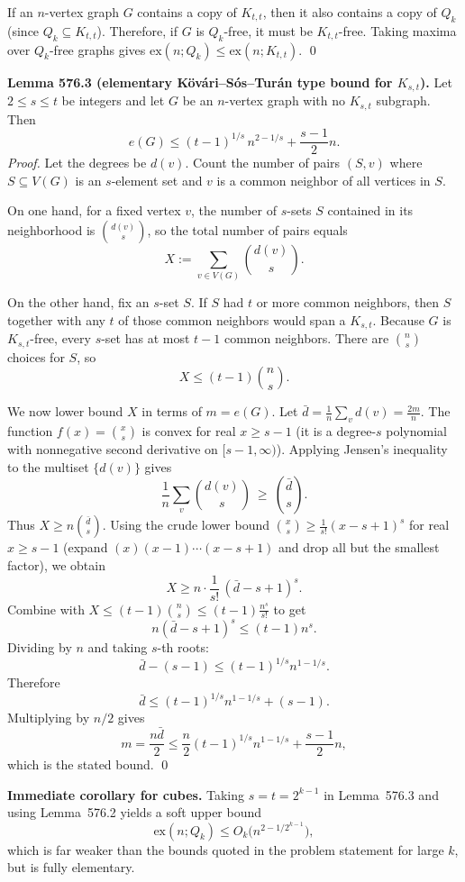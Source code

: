 If an $n$-vertex graph $G$ contains a copy of $K_{t,t}$, then it also contains a copy of $Q_k$ (since $Q_k\subseteq K_{t,t}$).
Therefore, if $G$ is $Q_k$-free, it must be $K_{t,t}$-free.
Taking maxima over $Q_k$-free graphs gives
$\mathrm{ex}(n;Q_k)\le \mathrm{ex}(n;K_{t,t})$.
\qed

\medskip
\textbf{Lemma 576.3 (elementary K\"ov\'ari--S\'os--Tur\'an type bound for $K_{s,t}$).}
Let $2\le s\le t$ be integers and let $G$ be an $n$-vertex graph with no $K_{s,t}$ subgraph.
Then
\[
 e(G) \le (t-1)^{1/s}\, n^{2-1/s} + \frac{s-1}{2}n.
\]
\emph{Proof.}
Let the degrees be $d(v)$.
Count the number of pairs $(S,v)$ where $S\subseteq V(G)$ is an $s$-element set and $v$ is a common neighbor of all vertices in $S$.

On one hand, for a fixed vertex $v$, the number of $s$-sets $S$ contained in its neighborhood is $\binom{d(v)}{s}$, so the total number of pairs equals
\[ X:=\sum_{v\in V(G)}\binom{d(v)}{s}. \]

On the other hand, fix an $s$-set $S$. If $S$ had $t$ or more common neighbors, then $S$ together with any $t$ of those common neighbors would span a $K_{s,t}$.
Because $G$ is $K_{s,t}$-free, every $s$-set has at most $t-1$ common neighbors.
There are $\binom{n}{s}$ choices for $S$, so
\[ X\le (t-1)\binom{n}{s}. \]

We now lower bound $X$ in terms of $m=e(G)$.
Let $\bar d=\frac{1}{n}\sum_v d(v)=\frac{2m}{n}$.
The function $f(x)=\binom{x}{s}$ is convex for real $x\ge s-1$ (it is a degree-$s$ polynomial with nonnegative second derivative on $[s-1,\infty)$).
Applying Jensen's inequality to the multiset $\{d(v)\}$ gives
\[
\frac{1}{n}\sum_v \binom{d(v)}{s}\ \ge\ \binom{\bar d}{s}.
\]
Thus $X\ge n\binom{\bar d}{s}$.
Using the crude lower bound $\binom{x}{s}\ge \frac{1}{s!}(x-s+1)^s$ for real $x\ge s-1$ (expand $(x)(x-1)\cdots(x-s+1)$ and drop all but the smallest factor), we obtain
\[
X\ge n\cdot \frac{1}{s!}\,(\bar d-s+1)^s.
\]
Combine with $X\le (t-1)\binom{n}{s}\le (t-1)\frac{n^s}{s!}$ to get
\[
 n(\bar d-s+1)^s \le (t-1)n^s.
\]
Dividing by $n$ and taking $s$-th roots:
\[
\bar d - (s-1) \le (t-1)^{1/s} n^{1-1/s}.
\]
Therefore
\[
\bar d\le (t-1)^{1/s} n^{1-1/s} + (s-1).
\]
Multiplying by $n/2$ gives
\[
 m=\frac{n\bar d}{2} \le \frac{n}{2}(t-1)^{1/s} n^{1-1/s} + \frac{s-1}{2}n,
\]
which is the stated bound.
\qed

\medskip
\textbf{Immediate corollary for cubes.}
Taking $s=t=2^{k-1}$ in Lemma~576.3 and using Lemma~576.2 yields a soft upper bound
\[
\mathrm{ex}(n;Q_k) \le O_k\big(n^{2-1/2^{k-1}}\big),
\]
which is far weaker than the bounds quoted in the problem statement for large $k$, but is fully elementary.

